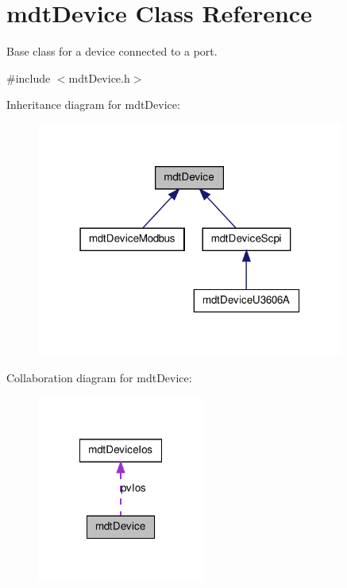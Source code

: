 \hypertarget{classmdt_device}{
\section{mdtDevice Class Reference}
\label{classmdt_device}
}


Base class for a device connected to a port.  




{\ttfamily \#include $<$mdtDevice.h$>$}



Inheritance diagram for mdtDevice:\nopagebreak
\begin{figure}[H]
\begin{center}
\leavevmode
\includegraphics[width=286pt]{classmdt_device__inherit__graph}
\end{center}
\end{figure}


Collaboration diagram for mdtDevice:\nopagebreak
\begin{figure}[H]
\begin{center}
\leavevmode
\includegraphics[width=156pt]{classmdt_device__coll__graph}
\end{center}
\end{figure}
